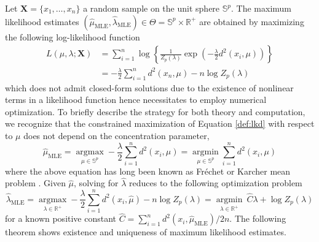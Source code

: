 \documentclass[11pt]{article}
\DeclareMathOperator*{\argmin}{argmin}
\DeclareMathOperator*{\argmax}{argmax}
\newcommand{\bbR}{\mathbb{R}}
\newcommand{\bbS}{\mathbb{S}}
\newcommand{\bfX}{\mathbf{X}}
\newcommand{\Frechet}{Fr\'{e}chet }
\begin{document}
Let $\bfX = \lbrace x_1, \ldots, x_n\rbrace$ a random sample on the unit sphere $\bbS^p$. The maximum likelihood estimates $(\hat{\mu}_{\text{MLE}}, \hat{\lambda}_{\text{MLE}}) \in \Theta = \bbS^p \times \bbR^+$ are obtained by maximizing the following log-likelihood function
\begin{equation}\label{def:lkd}
\begin{split}
L(\mu,\lambda; \bfX) &= \sum_{i=1}^n \log \left\lbrace \frac{1}{Z_p(\lambda)} \exp \left(-\frac{\lambda}{2}d^2(x_i,\mu)\right)\right\rbrace\\ 
&= -\frac{\lambda}{2}\sum_{i=1}^n d^2 (x_n,\mu) - n\log Z_p(\lambda)
\end{split}
\end{equation}
which does not admit closed-form solutions due to the existence of nonlinear terms in a likelihood function hence necessitates to employ numerical optimization. To briefly describe the strategy for both theory and computation, we recognize that the constrained maximization of Equation \eqref{def:lkd} with respect to $\mu$ does not depend on the concentration parameter,
\begin{equation}\label{def:problem_mu}
\hat{\mu}_{\text{MLE}} = \underset{\mu \in \bbS^p}{\argmax} -\frac{\lambda}{2} \sum_{i=1}^n d^2(x_i,\mu) = \underset{\mu \in \bbS^p}{\argmin} \sum_{i=1}^n  d^2 (x_i, \mu)
\end{equation}
where the above equation has long been known as  \Frechet or Karcher mean problem \citep{frechet_les_1948, grove_how_1973-1, afsari_riemannian_2011}.  Given $\hat{\mu}$, solving for $\hat{\lambda}$ reduces to the following optimization problem
\begin{equation}\label{def:problem_lambda}
\hat{\lambda}_{\text{MLE}} = \underset{\lambda \in \bbR^+}{\argmax} -\frac{\lambda}{2} \sum_{i=1}^n d^2(x_i,\hat{\mu}) - n \log Z_p(\lambda) =  \underset{\lambda \in \bbR^+}{\argmin} ~\hat{C} \lambda + \log Z_p (\lambda)
\end{equation}
for a known positive constant $\hat{C} = \sum_{i=1}^n d^2(x_i,\hat{\mu}_{\text{MLE}})/2n$. The following theorem shows existence and uniqueness of maximum likelihood estimates.
\end{document}
